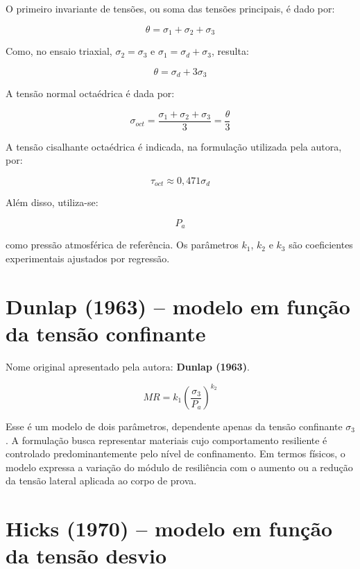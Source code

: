 \documentclass[12pt,a4paper]{article}
\begin{document}
O primeiro invariante de tensões, ou soma das tensões principais, é dado por:

\begin{equation}
\theta=\sigma_1+\sigma_2+\sigma_3
\end{equation}

Como, no ensaio triaxial, $\sigma_2=\sigma_3$ e $\sigma_1=\sigma_d+\sigma_3$, resulta:

\begin{equation}
\theta=\sigma_d+3\sigma_3
\end{equation}

A tensão normal octaédrica é dada por:

\begin{equation}
\sigma_{oct}=\frac{\sigma_1+\sigma_2+\sigma_3}{3}=\frac{\theta}{3}
\end{equation}

A tensão cisalhante octaédrica é indicada, na formulação utilizada pela autora, por:

\begin{equation}
\tau_{oct}\approx0{,}471\sigma_d
\end{equation}

Além disso, utiliza-se:

\begin{equation}
P_a
\end{equation}

como pressão atmosférica de referência. Os parâmetros $k_1$, $k_2$ e $k_3$ são coeficientes experimentais ajustados por regressão.

\section{Dunlap (1963) -- modelo em função da tensão confinante}

Nome original apresentado pela autora: \textbf{Dunlap (1963)}.

\begin{equation}
MR=k_1\left(\frac{\sigma_3}{P_a}\right)^{k_2}
\end{equation}

Esse é um modelo de dois parâmetros, dependente apenas da tensão confinante $\sigma_3$. A formulação busca representar materiais cujo comportamento resiliente é controlado predominantemente pelo nível de confinamento. Em termos físicos, o modelo expressa a variação do módulo de resiliência com o aumento ou a redução da tensão lateral aplicada ao corpo de prova.

\section{Hicks (1970) -- modelo em função da tensão desvio}
\end{document}
